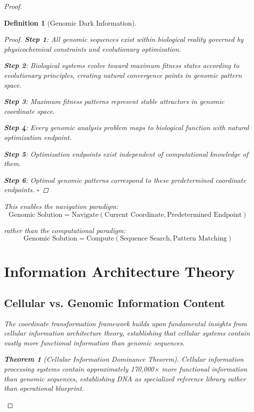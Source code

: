 \documentclass[12pt,a4paper]{article}
\newtheorem{theorem}{Theorem}
\newtheorem{definition}{Definition}
\begin{document}
\begin{proof}
\begin{definition}[Genomic Dark Information]
\begin{proof}
\textbf{Step 1}: All genomic sequences exist within biological reality governed by physicochemical constraints and evolutionary optimization.

\textbf{Step 2}: Biological systems evolve toward maximum fitness states according to evolutionary principles, creating natural convergence points in genomic pattern space.

\textbf{Step 3}: Maximum fitness patterns represent stable attractors in genomic coordinate space.

\textbf{Step 4}: Every genomic analysis problem maps to biological function with natural optimization endpoint.

\textbf{Step 5}: Optimization endpoints exist independent of computational knowledge of them.

\textbf{Step 6}: Optimal genomic patterns correspond to these predetermined coordinate endpoints. $\square$
\end{proof}

This enables the navigation paradigm:
\begin{equation}
\text{Genomic Solution} = \text{Navigate}(\text{Current Coordinate}, \text{Predetermined Endpoint})
\end{equation}

rather than the computational paradigm:
\begin{equation}
\text{Genomic Solution} = \text{Compute}(\text{Sequence Search}, \text{Pattern Matching})
\end{equation}

\section{Information Architecture Theory}

\subsection{Cellular vs. Genomic Information Content}

The coordinate transformation framework builds upon fundamental insights from cellular information architecture theory, establishing that cellular systems contain vastly more functional information than genomic sequences.

\begin{theorem}[Cellular Information Dominance Theorem]
Cellular information processing systems contain approximately 170,000× more functional information than genomic sequences, establishing DNA as specialized reference library rather than operational blueprint.
\end{theorem}


\end{definition}
\end{proof}
\end{document}
